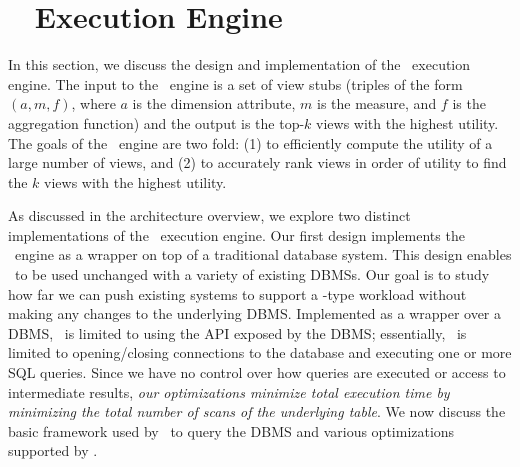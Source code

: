 
\section{{\large \VizRecDB\ } Execution Engine}
In this section, we discuss the design and implementation of the \VizRecDB\
execution engine. 
The input to the \VizRecDB\ engine is a set of view stubs (triples of the form
$(a, m, f)$, where $a$ is the dimension attribute, $m$ is the measure,
and $f$ is the aggregation function) and the output is the top-$k$ views with the highest utility.
The goals of the \VizRecDB\ engine are two fold:
(1) to efficiently compute the utility of a large number of views, and 
(2) to accurately rank views in order of
utility to find the $k$ views with the highest utility.


As discussed in the architecture overview, we explore two distinct
implementations of the \VizRecDB\ execution engine.
Our first design implements the \VizRecDB\ engine as a wrapper on top of a
traditional database system.
This design enables \VizRecDB\ to be used unchanged with a variety of
existing DBMSs.
Our goal is to study how far we can push existing systems to
support a \VizRecDB-type workload 
without making any changes to the underlying DBMS.
Implemented as a wrapper over a DBMS, \VizRecDB\ is limited to using the API
exposed by the DBMS; essentially, 
\VizRecDB\ is limited to opening/closing connections to the
database and executing one or more SQL queries. 
Since we have no control over how queries are executed or access to intermediate
results, {\it our optimizations minimize total execution time by minimizing the
total number of scans of the underlying table}.
We now discuss the basic framework used by \VizRecDB\ to query the DBMS and various
optimizations supported by \VizRecDB.

